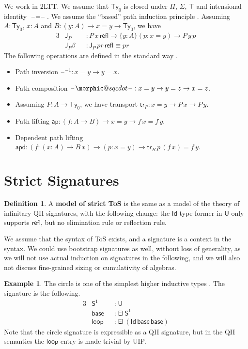 \documentclass[12pt,a4paper,twoside,openany]{book}
\makeatletter
\DeclareRobustCommand{\sqcdot}{\mathbin{\mathpalette\morphic@sqcdot\relax}}
\newcommand{\morphic@sqcdot}[2]{%
  \sbox\z@{$\m@th#1\centerdot$}%
  \ht\z@=.33333\ht\z@
  \vcenter{\box\z@}%
}
\theoremstyle{remark}
\theoremstyle{definition}
\newtheorem{mydefinition}{Definition}
\newtheorem{myexample}{Example}
\theoremstyle{theorem}
\newcommand{\mi}[1]{\mathit{#1}}
\newcommand{\ms}[1]{\mathsf{#1}}
\newcommand{\ap}{\ms{ap}}
\newcommand{\apd}{\ms{apd}}
\newcommand{\tr}{\ms{tr}}
\newcommand{\J}{\ms{J}}
\newcommand{\refl}{\mathsf{refl}}
\newcommand{\Ty}{\mathsf{Ty}}
\newcommand{\U}{\mathsf{U}}
\newcommand{\El}{\mathsf{El}}
\newcommand{\Id}{\mathsf{Id}}
\newcommand{\blank}{\mathord{\hspace{1pt}\text{--}\hspace{1pt}}}
\makeatother
\begin{document}
We work in 2LTT. We assume that $\Ty_0$ is closed under $\Pi$, $\Sigma$, $\top$
and intensional identity $\blank\!=\!\blank$. We assume the ``based'' path induction principle
\cite[Section~1.12.1]{hottbook}. Assuming $A : \Ty_0$, $x : A$ and $B : (y : A) \to x = y \to \Ty_0$,
we have
\begin{alignat*}{3}
  & \J_P      &&: P\,x\,\refl \to \{y : A\}(p : x = y) \to P\,y\,p\\
  & \J_P\beta &&: \J_P\,\mi{pr}\,\refl \equiv \mi{pr}
\end{alignat*}
The following operations are defined in the standard way
\cite[Section~2]{hottbook}.
\begin{itemize}
  \item Path inversion $\blank^{-1} : x = y \to y = x$.
  \item Path composition $\blank\!\sqcdot\!\blank : x = y \to y = z \to x = z$.
  \item Assuming $P : A \to \Ty_0$, we have transport $\tr_P : x = y \to P\,x \to P\,y$.
  \item Path lifting $\ap : (f : A \to B) \to x = y \to f\,x = f\,y$.
  \item Dependent path lifting $\apd : (f : (x : A) \to B\,x) \to (p : x = y) \to \tr_B\,p\,(f\,x) = f\,y$.
\end{itemize}

\section{Strict Signatures}

\begin{mydefinition}
A \textbf{model of strict ToS} is the same as a model of the theory of
infinitary QII signatures, with the following change: the $\Id$ type former in
$\U$ only supports $\refl$, but no elimination rule or reflection rule.
\end{mydefinition}

We assume that the syntax of ToS exists, and a signature is a context in the
syntax. We could use bootstrap signatures as well, without loss of generality,
as we will not use actual induction on signatures in the following, and we will
also not discuss fine-grained sizing or cumulativity of algebras.

\begin{myexample} The circle is one of the simplest higher inductive types \cite[Section~6.4]{hottbook}. The signature is the following.
\begin{alignat*}{3}
  &\ms{S}^1  &&: \U\\
  &\ms{base} &&: \El\,\ms{S}^1\\
  &\ms{loop} &&: \El\,(\Id\,\ms{base}\,\ms{base})
\end{alignat*}
Note that the circle signature is expressible as a QII signature, but in the QII
semantics the $\ms{loop}$ entry is made trivial by UIP.
\end{myexample}
\end{document}
